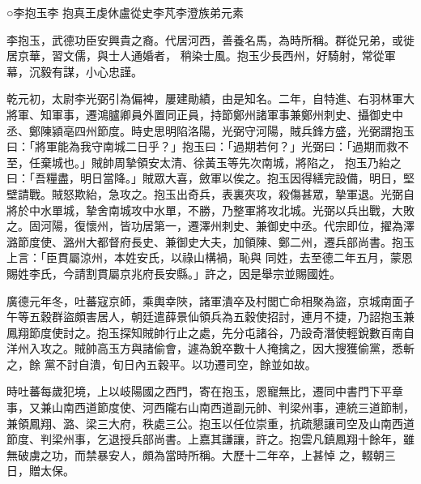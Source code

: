 
\begin{pinyinscope}

 ○李抱玉李
 抱真王虔休盧從史李芃李澄族弟元素



 李抱玉，武德功臣安興貴之裔。代居河西，善養名馬，為時所稱。群從兄弟，或徙居京華，習文儒，與士人通婚者，
 稍染士風。抱玉少長西州，好騎射，常從軍幕，沉毅有謀，小心忠謹。



 乾元初，太尉李光弼引為偏裨，屢建勛績，由是知名。二年，自特進、右羽林軍大將軍、知軍事，遷鴻臚卿員外置同正員，持節鄭州諸軍事兼鄭州刺史、攝御史中丞、鄭陳潁亳四州節度。時史思明陷洛陽，光弼守河陽，賊兵鋒方盛，光弼謂抱玉曰：「將軍能為我守南城二日乎？」抱玉曰：「過期若何？」光弼曰：「過期而救不至，任棄城也。」賊帥周摯領安太清、徐黃玉等先次南城，將陷之，
 抱玉乃紿之曰：「吾糧盡，明日當降。」賊眾大喜，斂軍以俟之。抱玉因得繕完設備，明日，堅壁請戰。賊怒欺紿，急攻之。抱玉出奇兵，表裏夾攻，殺傷甚眾，摯軍退。光弼自將於中水單城，摯舍南城攻中水單，不勝，乃整軍將攻北城。光弼以兵出戰，大敗之。固河陽，復懷州，皆功居第一，遷澤州刺史、兼御史中丞。代宗即位，擢為澤潞節度使、潞州大都督府長史、兼御史大夫，加領陳、鄭二州，遷兵部尚書。抱玉上言：「臣貫屬涼州，本姓安氏，以祿山構禍，恥與
 同姓，去至德二年五月，蒙恩賜姓李氏，今請割貫屬京兆府長安縣。」許之，因是舉宗並賜國姓。



 廣德元年冬，吐蕃寇京師，乘輿幸陜，諸軍潰卒及村閭亡命相聚為盜，京城南面子午等五穀群盜頗害居人，朝廷遣薛景仙領兵為五穀使招討，連月不捷，乃詔抱玉兼鳳翔節度使討之。抱玉探知賊帥行止之處，先分屯諸谷，乃設奇潛使輕銳數百南自洋州入攻之。賊帥高玉方與諸偷會，遽為銳卒數十人掩擒之，因大搜獲偷黨，悉斬之，餘
 黨不討自潰，旬日內五穀平。以功遷司空，餘並如故。



 時吐蕃每歲犯境，上以岐陽國之西門，寄在抱玉，恩寵無比，遷同中書門下平章事，又兼山南西道節度使、河西隴右山南西道副元帥、判梁州事，連統三道節制，兼領鳳翔、潞、梁三大府，秩處三公。抱玉以任位崇重，抗疏懇讓司空及山南西道節度、判梁州事，乞退授兵部尚書。上嘉其謙讓，許之。抱雲凡鎮鳳翔十餘年，雖無破虜之功，而禁暴安人，頗為當時所稱。大歷十二年卒，上甚悼
 之，輟朝三日，贈太保。




\end{pinyinscope}
